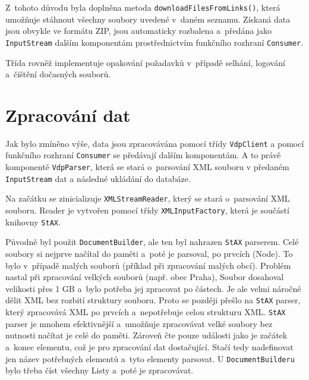 Z~tohoto důvodu byla doplněna metoda \texttt{downloadFilesFromLinks()}, která umožňuje stáhnout všechny soubory uvedené v~daném seznamu.  
Získaná data jsou obvykle ve formátu ZIP, jsou automaticky rozbalena a~předána jako \texttt{InputStream} dalším komponentám  
prostřednictvím funkčního rozhraní \texttt{Consumer}.  

Třída rovněž implementuje opakování požadavků v~případě selhání, logování a~čištění dočasných souborů.

\newpage

\section{Zpracování dat}
Jak bylo zmíněno výše, data jsou zpracovávána pomocí třídy \texttt{VdpClient} 
a pomocí funkčního rozhraní \texttt{Consumer} se předávají dalším komponentám.
A to právě komponentě \texttt{VdpParser}, která se stará o~parsování XML souboru v předaném \texttt{InputStream} 
dat a následné ukládání do databáze.

Na začátku se zinicializuje \texttt{XMLStreamReader}, který se stará o~parsování XML souboru. 
Reader je vytvořen pomocí třídy \texttt{XMLInputFactory}, která je součástí \\ knihovny \texttt{StAX}.

Původně byl použit \texttt{DocumentBuilder}, ale ten byl nahrazen \texttt{StAX} parserem.
Celé soubory si nejprve načítal do paměti a~poté je parsoval, po prvcích (Node).
To bylo v~případě malých souborů (příklad při zpracování malých obcí). 
Problém nastal při zpracování velkých souborů (např. obec Praha),
Soubor dosahoval velikosti přes 1 GB a~bylo potřeba jej zpracovat po částech.
Je ale velmi náročné dělit XML bez rozbití struktury souboru.
Proto se později přešlo na \texttt{StAX} parser, který zpracovává XML po prvcích a~nepotřebuje celou strukturu XML.
\texttt{StAX} parser je mnohem efektivnější a~umožňuje zpracovávat velké soubory bez nutnosti načítat je celé do paměti.
Zároveň čte pouze události jako je začátek a~konec elementu, což je pro zpracování dat dostačující.
Stačí tedy nadefinovat jen název potřebných elementů a~tyto elementy parsovat.
U \texttt{DocumentBuilderu} bylo třeba číst všechny Listy a~poté je zpracovávat.

